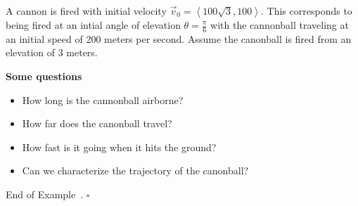 \documentclass[10pt]{article}
\theoremstyle{definition}
\newtheorem{example}[theorem]{Example}
\renewenvironment{example}
{\begin{oldexample}}
  {\par\smallskip\hfill   End of Example~\theexample. $\square$    \par\end{oldexample}}
\newcommand{\1}[1]{\textbf{1}_{\left[#1\right]}} %
\begin{document}
\begin{example}
  A cannon is fired with initial velocity $\vec{v}_{0} = \left\langle 100 \sqrt{3},100 \right\rangle$.
  This corresponds to being fired at an intial angle of elevation $\theta=\frac{\pi}{6}$ with the
  cannonball traveling at an initial speed of 200 meters per second. Assume the canonball is fired from
  an elevation of 3 meters.

  \textbf{Some questions}
  \begin{itemize}
    \item How long is the cannonball airborne?
    \item How far does the canonball travel?
    \item How fast is it going when it hits the ground?
    \item Can we characterize the trajectory of the canonball?
  \end{itemize}


\end{example}
\end{document}
